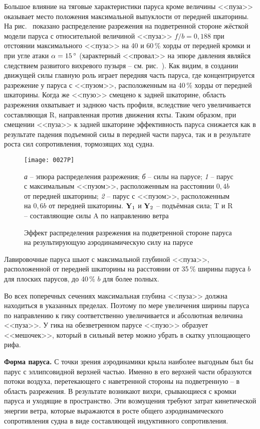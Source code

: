 Большое влияние на тяговые характеристики паруса кроме величины
<<пуза>> оказывает место положения максимальной выпуклости от передней
шкаторины. На рис.~ показано распределение разрежения на
подветренной стороне жёсткой модели паруса с относительной величиной
<<пуза>> $f/b = 0,188$ при отстоянии максимального <<пуза>> на 40 и
60\,\% хорды от передней кромки и при угле атаки $\alpha = 15\,^\circ$
(характерный <<провал>> на эпюре давления являйся следствием развитого
вихревого пузыря \--- см. рис.~). Как видим, в создании
движущей силы главную роль играет передняя часть паруса, где
концентрируется разрежение у паруса с <<пузом>>, расположенным на
40\,\% хорды от передней шкаторины. Когда же <<пузо>> смещено к задней
шкаторине, область разрежения охватывает и заднюю часть профиля,
вследствие чего увеличивается составляющая \ve R, направленная против
движения яхты. Таким образом, при смещении <<пуза>> к задней шкаторине
эффективность паруса снижается как в результате падения подъемной силы
в передней части паруса, так и в результате роста сил сопротивления,
тормозящих ход судна.

\begin{figure}[htb]
  \centering
  \texttt{[image: 0027P]}
  \caption{Эффект распределения разрежения на подветренной стороне паруса на результирующую аэродинамическую силу на парусе}
  \label{fig:27}
  \small
  \centering{}
  \textit{а} \--- эпюра распределения разрежения; \textit{б} \--- силы на парусе; \textit{1} \--- парус с максимальным <<пузом>>, расположенным на расстоянии $0,4 b$ от передней шкаторины; \textit{2} \--- парус с <<пузом>>, расположенным на $0,6 b$ от передней шкаторины. $\mathbf{Y}_1$ и $\mathbf{Y}_2$ \--- подъёмная сила; \ve T и \ve R \--- составляющие силы \ve A по направлению ветра
\end{figure}

Лавировочные паруса шьют с максимальной глубиной <<пуза>>,
расположенной от передней шкаторины на расстоянии от 35\,\%
ширины паруса $b$ для плоских парусов, до 40\,\% $b$ для более
полных.

Во всех поперечных сечениях максимальная глубина <<пуза>> должна
находиться в указанных пределах. Поэтому по мере увеличения ширины
паруса по направлению к гику соответственно увеличивается и абсолютная
величина <<пуза>>. У гика на обезветренном парусе <<пузо>> образует
<<мешочек>>, который в сильный ветер можно убрать в скатку уплощающего
рифа.

\textbf{Форма паруса.} С точки зрения аэродинамики
крыла наиболее выгодным был бы парус с эллипсовидной верхней
частью. Именно в его верхней части образуются потоки воздуха,
перетекающего с наветренной стороны на подветренную \--- в область
разрежения. В результате возникают вихри, срывающиеся с кромки паруса
и уходящие в пространство. Эти возмущения требуют затрат кинетической
энергии ветра, которые выражаются в росте общего аэродинамического
сопротивления судна в виде составляющей индуктивного сопротивления.

